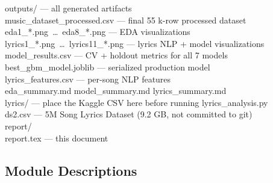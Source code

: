 \documentclass[11pt, letterpaper]{article}
\newcommand{\fdesc}[1]{\small\color{mutedgray} — #1}
\begin{document}
\begin{mdframed}[backgroundcolor=lightgray, linewidth=0pt,
                 innerleftmargin=12pt, innertopmargin=8pt, innerbottommargin=8pt]
\begin{small}
\quad outputs/ \fdesc{all generated artifacts}\\
\quad\quad music\_dataset\_processed.csv \fdesc{final 55 k-row processed dataset}\\
\quad\quad eda1\_*.png\ \ldots\ eda8\_*.png \fdesc{EDA visualizations}\\
\quad\quad lyrics1\_*.png\ \ldots\ lyrics11\_*.png \fdesc{lyrics NLP + model visualizations}\\
\quad\quad model\_results.csv \fdesc{CV + holdout metrics for all 7 models}\\
\quad\quad best\_gbm\_model.joblib \fdesc{serialized production model}\\
\quad\quad lyrics\_features.csv \fdesc{per-song NLP features}\\
\quad\quad eda\_summary.md \quad model\_summary.md \quad lyrics\_summary.md\\[0.4em]
\quad lyrics/ \fdesc{place the Kaggle CSV here before running lyrics\_analysis.py}\\
\quad\quad ds2.csv \fdesc{5M Song Lyrics Dataset (9.2 GB, not committed to git)}\\[0.4em]
\quad report/\\
\quad\quad report.tex \fdesc{this document}
\end{small}
\end{mdframed}

\subsection{Module Descriptions}
\end{document}
